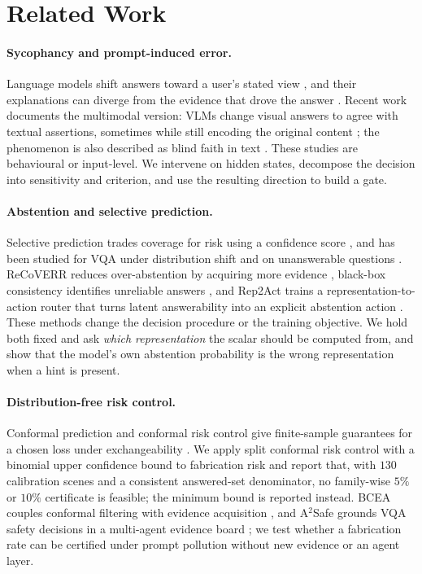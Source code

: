 \documentclass[10pt]{article}
\begin{document}
\section{Related Work}

\paragraph{Sycophancy and prompt-induced error.}
Language models shift answers toward a user's stated view \citep{sharma2023sycophancy}, and their explanations can diverge from the evidence that drove the answer \citep{turpin2023language}. Recent work documents the multimodal version: VLMs change visual answers to agree with textual assertions, sometimes while still encoding the original content \citep{hong2026tosee}; the phenomenon is also described as blind faith in text \citep{deng2025words}. These studies are behavioural or input-level. We intervene on hidden states, decompose the decision into sensitivity and criterion, and use the resulting direction to build a gate.

\paragraph{Abstention and selective prediction.}
Selective prediction trades coverage for risk using a confidence score \citep{geifman2017selective}, and has been studied for VQA under distribution shift and on unanswerable questions \citep{whitehead2022reliable}. ReCoVERR reduces over-abstention by acquiring more evidence \citep{srinivasan2024selective}, black-box consistency identifies unreliable answers \citep{khan2024identifying}, and Rep2Act trains a representation-to-action router that turns latent answerability into an explicit abstention action \citep{he2026rep2act}. These methods change the decision procedure or the training objective. We hold both fixed and ask \emph{which representation} the scalar should be computed from, and show that the model's own abstention probability is the wrong representation when a hint is present.

\paragraph{Distribution-free risk control.}
Conformal prediction and conformal risk control give finite-sample guarantees for a chosen loss under exchangeability \citep{angelopoulos2024conformal,bates2021distributionfree}. We apply split conformal risk control with a binomial upper confidence bound to fabrication risk and report that, with $130$ calibration scenes and a consistent answered-set denominator, no family-wise $5\%$ or $10\%$ certificate is feasible; the minimum bound is reported instead. BCEA couples conformal filtering with evidence acquisition \citep{xu2026bcea}, and A$^2$Safe grounds VQA safety decisions in a multi-agent evidence board \citep{xu2026a2safe}; we test whether a fabrication rate can be certified under prompt pollution without new evidence or an agent layer.
\end{document}
